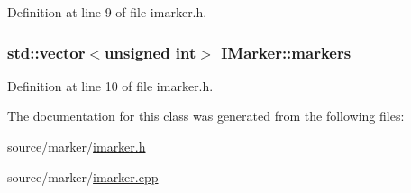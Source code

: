 Definition at line 9 of file imarker.h.

\hypertarget{class_i_marker_a1c1b6ba790e3adf5fa8d9b24c06b10d7}{
\subsubsection[{markers}]{\setlength{\rightskip}{0pt plus 5cm}std::vector$<$unsigned int$>$ {\bf IMarker::markers}}}
\label{class_i_marker_a1c1b6ba790e3adf5fa8d9b24c06b10d7}


Definition at line 10 of file imarker.h.



The documentation for this class was generated from the following files:\begin{DoxyCompactItemize}
\item 
source/marker/\hyperlink{imarker_8h}{imarker.h}\item 
source/marker/\hyperlink{imarker_8cpp}{imarker.cpp}\end{DoxyCompactItemize}
